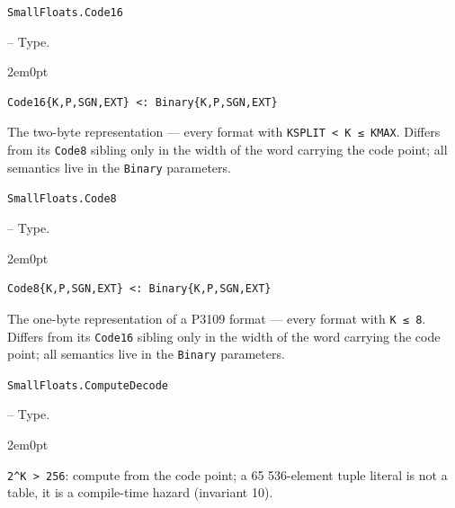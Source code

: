 \par\medskip\noindent\begin{minipage}{\linewidth}
\hypertarget{632943239165416513}{\texttt{SmallFloats.Code16}}  -- {Type.}
\nopagebreak
\begin{adjustwidth}{2em}{0pt}


\begin{verbatim}
Code16{K,P,SGN,EXT} <: Binary{K,P,SGN,EXT}
\end{verbatim}

The two-byte representation — every format with \texttt{KSPLIT < K ≤ KMAX}. Differs from its \texttt{Code8} sibling only in the width of the word carrying the code point; all semantics live in the \texttt{Binary} parameters.



\end{adjustwidth}
\end{minipage}
\par\medskip

\par\medskip\noindent\begin{minipage}{\linewidth}
\hypertarget{10616179233481181492}{\texttt{SmallFloats.Code8}}  -- {Type.}
\nopagebreak
\begin{adjustwidth}{2em}{0pt}


\begin{verbatim}
Code8{K,P,SGN,EXT} <: Binary{K,P,SGN,EXT}
\end{verbatim}

The one-byte representation of a P3109 format — every format with \texttt{K ≤ 8}. Differs from its \texttt{Code16} sibling only in the width of the word carrying the code point; all semantics live in the \texttt{Binary} parameters.



\end{adjustwidth}
\end{minipage}
\par\medskip

\par\medskip\noindent\begin{minipage}{\linewidth}
\hypertarget{3168615570275869760}{\texttt{SmallFloats.ComputeDecode}}  -- {Type.}
\nopagebreak
\begin{adjustwidth}{2em}{0pt}

\texttt{2{\textasciicircum}K > 256}: compute from the code point; a 65 536-element tuple literal is not a table, it is a compile-time hazard (invariant 10).



\end{adjustwidth}
\end{minipage}
\par\medskip

